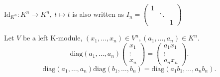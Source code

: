 \begin{exampleenv}
     $\mathrm{Id}_{K^n}:K^n\longrightarrow K^n,\ t\mapsto t$ is also written as $I_n=\begin{pmatrix}
  1&  & \\
  & \ddots  & \\
  &  &1
\end{pmatrix}$

Let $V$ be a left K-module, $(x_1,\dots,x_n)\in V^n, (a_1,\dots, a_n)\in K^n$.
$$\mathrm{diag}(a_1,\dots,a_n)\begin{pmatrix}
    x_1\\
    \vdots\\
    x_n
\end{pmatrix}=\begin{pmatrix}
    a_1x_1\\
    \vdots\\
    a_nx_n
\end{pmatrix}.$$
$$\mathrm{diag}(a_1,\dots,a_n)\mathrm{diag}(b_1,\dots,b_n)=\mathrm{diag}(a_1b_1,\dots,a_nb_n).$$
\end{exampleenv}





